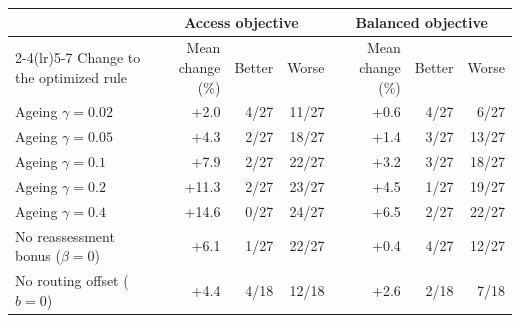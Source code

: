 \begin{tabular}{lrrrrrr}
\toprule
 & \multicolumn{3}{c}{Access objective} & \multicolumn{3}{c}{Balanced objective} \\
\cmidrule(lr){2-4}\cmidrule(lr){5-7}
Change to the optimized rule & Mean change (\%) & Better & Worse & Mean change (\%) & Better & Worse \\
\midrule
Ageing $\gamma=0.02$ & +2.0 & 4/27 & 11/27 & +0.6 & 4/27 & 6/27 \\
Ageing $\gamma=0.05$ & +4.3 & 2/27 & 18/27 & +1.4 & 3/27 & 13/27 \\
Ageing $\gamma=0.1$ & +7.9 & 2/27 & 22/27 & +3.2 & 3/27 & 18/27 \\
Ageing $\gamma=0.2$ & +11.3 & 2/27 & 23/27 & +4.5 & 1/27 & 19/27 \\
Ageing $\gamma=0.4$ & +14.6 & 0/27 & 24/27 & +6.5 & 2/27 & 22/27 \\
No reassessment bonus ($\beta=0$) & +6.1 & 1/27 & 22/27 & +0.4 & 4/27 & 12/27 \\
No routing offset ($b=0$) & +4.4 & 4/18 & 12/18 & +2.6 & 2/18 & 7/18 \\
\bottomrule
\end{tabular}
